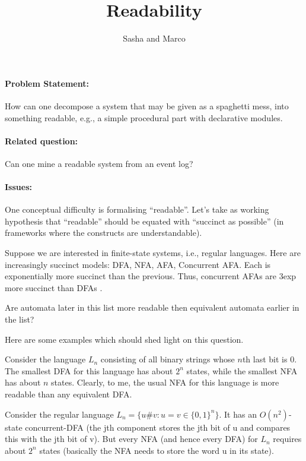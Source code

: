 \documentclass[a4paper,10pt]{article}
\title{Readability}
\author{Sasha and Marco}
\begin{document}
\maketitle

\paragraph{Problem Statement:}
How can one decompose a system that
may be given as a spaghetti mess, into something readable, e.g., a simple
procedural part with declarative modules.

\paragraph{Related question:} Can one mine a readable system from an event log?

\paragraph{Issues:} 
One conceptual difficulty is formalising ``readable''. Let's take as working hypothesis that ``readable'' should be equated with ``succinct as possible'' (in frameworks where the constructs are understandable).

\begin{example}
Suppose we are interested in finite-state systems, i.e., regular languages.
Here are increasingly succinct models: DFA, NFA, AFA, Concurrent AFA. Each is exponentially more succinct than the previous.
Thus, concurrent AFAs are 3exp more succinct than DFAs \cite{DBLP:journals/jacm/DrusinskyH94}. 
\end{example}

\begin{question}
Are automata later in this list more readable then equivalent automata earlier in the list?
\end{question}

Here are some examples which should shed light on this question.

\begin{example}
Consider the language $L_n$ consisting of all binary strings whose $n$th last bit is $0$. The smallest DFA for this language has about $2^n$ states, while the smallest NFA has about $n$ states. Clearly, to me, the usual NFA for this language is more readable than any equivalent DFA.
\end{example}

\begin{example}
Consider the regular language $L_n = \{u\#v : u = v \in \{0,1\}^n\}$.
It has an $O(n^2)$-state concurrent-DFA (the jth component stores the jth bit of u and compares this with the jth bit of v).
But every NFA (and hence every DFA) for $L_n$ requires about $2^n$ states (basically the NFA needs to store the word u in its state).
\end{example}
\end{document}

